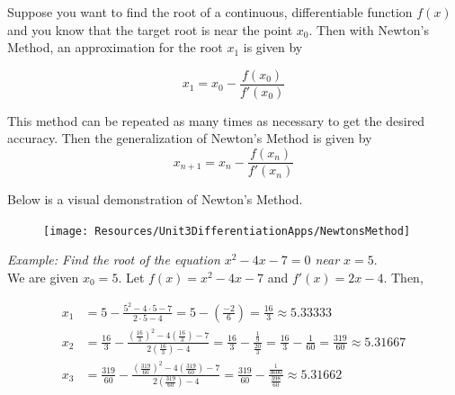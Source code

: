 \documentclass{article}
\begin{document}
        \noindent Suppose you want to find the root of a continuous, differentiable function $f(x)$ and you
        know that the target root is near the point $x_0$. Then with Newton's Method, an approximation
        for the root $x_1$ is given by

        \begin{equation*}
            x_1 = x_0 - \frac{f(x_0)}{f'(x_0)}
        \end{equation*}

        \noindent This method can be repeated as many times as necessary to get the desired accuracy.
        Then the generalization of Newton's Method is given by \\

        \begin{equation*}
            x_{n+1}     = x_n - \frac{f(x_n)}{f'(x_n)}
        \end{equation*}

        \noindent Below is a visual demonstration of Newton's Method.

        \begin{figure}
            \centering
            \texttt{[image: Resources/Unit3DifferentiationApps/NewtonsMethod]}
        \end{figure}

        \noindent \color{blue} \textit{Example: Find the root of the equation $x^2-4x-7=0$ near
        $x=5$}. \color{black} \\

        \noindent We are given $x_0=5$. Let $f(x)=x^2-4x-7$ and $f'(x)=2x-4$. Then,

        \begin{align*}
            x_1 &= 5 - \frac{5^2-4\cdot5-7}{2\cdot5-4} = 5-\left(\frac{-2}{6}\right)=\frac{16}{3}
                   \approx 5.33333 \\
            x_2 &= \frac{16}{3} - \frac{\left(\frac{16}{3}\right)^2-4\left(\frac{16}{3}\right)-7}
                   {2\left(\frac{16}{3}\right)-4} = \frac{16}{3}-\frac{\frac{1}{9}}{\frac{20}{3}}
                   = \frac{16}{3} - \frac{1}{60} = \frac{319}{60} \approx 5.31667 \\
            x_3 &= \frac{319}{60} - \frac{\left(\frac{319}{60}\right)^2-4\left(\frac{319}{60}\right)-7}
                   {2\left(\frac{319}{60}\right)-4} = \frac{319}{60} -
                    \frac{\frac{1}{3600}}{\frac{398}{60}} \approx 5.31662
        \end{align*}
\end{document}
